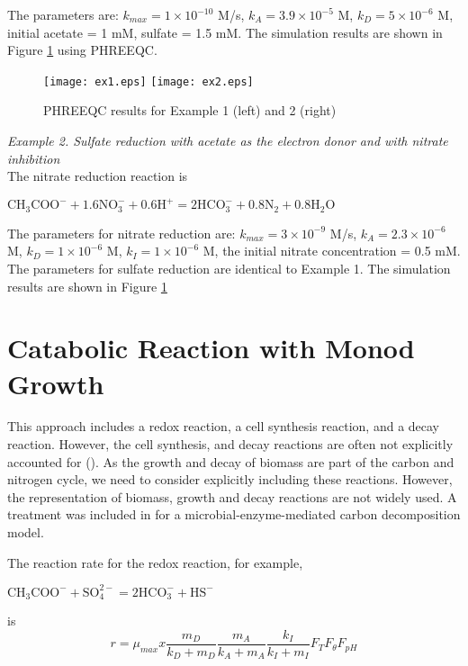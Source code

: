 \documentclass[12pt, a4paper]{article}
\begin{document}
The parameters are: $k_{max} = 1 \times 10^{-10}$ M/s, $k_A = 3.9 \times 10^{-5}$ M, $k_D = 5 \times 10^{-6}$ M, initial acetate = 1 mM, sulfate = 1.5 mM. The simulation results are shown in Figure \ref{Fig1} using PHREEQC.

\begin{figure}[h]
\centering
\texttt{[image: ex1.eps]}%
\texttt{[image: ex2.eps]}
\caption{PHREEQC results for Example 1 (left) and 2 (right)}
\label{Fig1}
\end{figure}

\emph{Example 2. Sulfate reduction with acetate as the electron donor and with nitrate inhibition}
\\
The nitrate reduction reaction is
\begin{center}
$\mathrm{CH_3COO^- + 1.6 NO_3^{-} + 0.6 H^+ = 2 HCO_3^- + 0.8 N_2 + 0.8 H_2O}$
\end{center}

The parameters for nitrate reduction are: $k_{max} = 3 \times 10^{-9}$ M/s, $k_A = 2.3 \times 10^{-6}$ M, $k_D = 1 \times 10^{-6}$ M, $k_I = 1 \times 10^{-6}$ M, the initial nitrate concentration = 0.5 mM. The parameters for sulfate reduction are identical to Example 1. The simulation results are shown in Figure \ref{Fig1}

\section{Catabolic Reaction with Monod Growth}
This approach includes a redox reaction, a cell synthesis reaction, and a decay reaction. However, the cell synthesis, and decay reactions are often not explicitly accounted for (\cite{Jin20111,Li2009,bethke2007geochemical,Gu2010141}). As the growth and decay of biomass are part of the carbon and nitrogen cycle, we need to consider explicitly including these reactions. However, the representation of biomass, growth and decay reactions are not widely used. A treatment was included in \cite{Wang2012} for a microbial-enzyme-mediated carbon decomposition model. 

The reaction rate for the redox reaction, for example,
\begin{center}
$\mathrm{CH_3COO^- + SO_4^{2-} = 2 HCO_3^- + HS^-}$
\end{center}
is
\begin{equation}  
r = \mu_{max}x\frac{m_D}{k_D + m_D}\frac{m_A}{k_A + m_A}\frac{k_I}{k_I + m_I}F_TF_{\theta}F_{pH}
\end{equation}
\end{document}
